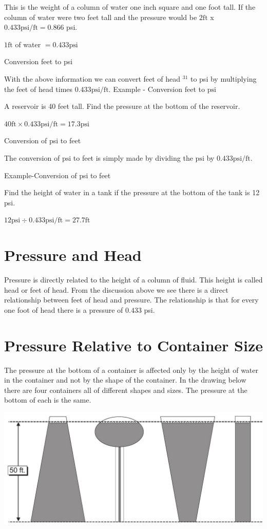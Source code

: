 \documentclass[10pt]{article}
\begin{document}
This is the weight of a column of water one inch square and one foot tall. If the column of water were two feet tall and the pressure would be $2 \mathrm{ft}$ x $0.433 \mathrm{psi} / \mathrm{ft}=0.866$ psi.

$1 \mathrm{ft}$ of water $=0.433 \mathrm{psi}$

Conversion feet to psi

With the above information we can convert feet of head ${ }^{31}$ to psi by multiplying the feet of head times $0.433 \mathrm{psi} / \mathrm{ft}$. Example - Conversion feet to $\mathrm{psi}$

A reservoir is 40 feet tall. Find the pressure at the bottom of the reservoir.

$40 \mathrm{ft} \times 0.433 \mathrm{psi} / \mathrm{ft}=17.3 \mathrm{psi}$

Conversion of psi to feet

The conversion of $\mathrm{psi}$ to feet is simply made by dividing the $\mathrm{psi}$ by $0.433 \mathrm{psi} / \mathrm{ft}$.

Example-Conversion of psi to feet

Find the height of water in a tank if the pressure at the bottom of the tank is 12 psi.

$12 \mathrm{psi} \div 0.433 \mathrm{psi} / \mathrm{ft}=27.7 \mathrm{ft}$

\section{Pressure and Head}
Pressure is directly related to the height of a column of fluid. This height is called head or feet of head. From the discussion above we see there is a direct relationship between feet of head and pressure. The relationship is that for every one foot of head there is a pressure of $0.433$ psi.

\section{Pressure Relative to Container Size}
The pressure at the bottom of a container is affected only by the height of water in the container and not by the shape of the container. In the drawing below there are four containers all of different shapes and sizes. The pressure at the bottom of each is the same.

\includegraphics[max width=\textwidth]{2022_11_03_65aa625ded296bdfd01fg-17}
\end{document}
